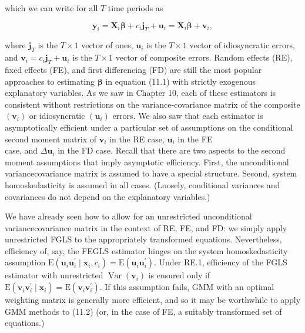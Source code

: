 \documentclass[10pt]{article}
\begin{document}
which we can write for all $T$ time periods as


\begin{equation*}
\mathbf{y}_{i}=\mathbf{X}_{i} \boldsymbol{\beta}+c_{i} \mathbf{j}_{T}+\mathbf{u}_{i}=\mathbf{X}_{i} \boldsymbol{\beta}+\mathbf{v}_{i}, \tag{11.2}
\end{equation*}


where $\mathbf{j}_{T}$ is the $T \times 1$ vector of ones, $\mathbf{u}_{i}$ is the $T \times 1$ vector of idiosyncratic errors, and $\mathbf{v}_{i}=c_{i} \mathbf{j}_{T}+\mathbf{u}_{i}$ is the $T \times 1$ vector of composite errors. Random effects (RE), fixed effects (FE), and first differencing (FD) are still the most popular approaches to estimating $\boldsymbol{\beta}$ in equation (11.1) with strictly exogenous explanatory variables. As we saw in Chapter 10, each of these estimators is consistent without restrictions on the variance-covariance matrix of the composite $\left(\mathbf{v}_{i}\right)$ or idiosyncratic $\left(\mathbf{u}_{i}\right)$ errors. We also saw that each estimator is asymptotically efficient under a particular set of assumptions on the conditional second moment matrix of $\mathbf{v}_{i}$ in the RE case, $\mathbf{u}_{i}$ in the FE\\
case, and $\Delta \mathbf{u}_{i}$ in the FD case. Recall that there are two aspects to the second moment assumptions that imply asymptotic efficiency. First, the unconditional variancecovariance matrix is assumed to have a special structure. Second, system homoskedasticity is assumed in all cases. (Loosely, conditional variances and covariances do not depend on the explanatory variables.)

We have already seen how to allow for an unrestricted unconditional variancecovariance matrix in the context of RE, FE, and FD: we simply apply unrestricted FGLS to the appropriately transformed equations. Nevertheless, efficiency of, say, the FEGLS estimator hinges on the system homoskedasticity assumption $\mathrm{E}\left(\mathbf{u}_{i} \mathbf{u}_{i}^{\prime} \mid \mathbf{x}_{i}, c_{i}\right)=\mathrm{E}\left(\mathbf{u}_{i} \mathbf{u}_{i}^{\prime}\right)$. Under RE.1, efficiency of the FGLS estimator with unrestricted $\operatorname{Var}\left(\mathbf{v}_{i}\right)$ is ensured only if $\mathrm{E}\left(\mathbf{v}_{i} \mathbf{v}_{i}^{\prime} \mid \mathbf{x}_{i}\right)=\mathrm{E}\left(\mathbf{v}_{i} \mathbf{v}_{i}^{\prime}\right)$. If this assumption fails, GMM with an optimal weighting matrix is generally more efficient, and so it may be worthwhile to apply GMM methods to (11.2) (or, in the case of FE, a suitably transformed set of equations.)
\end{document}
